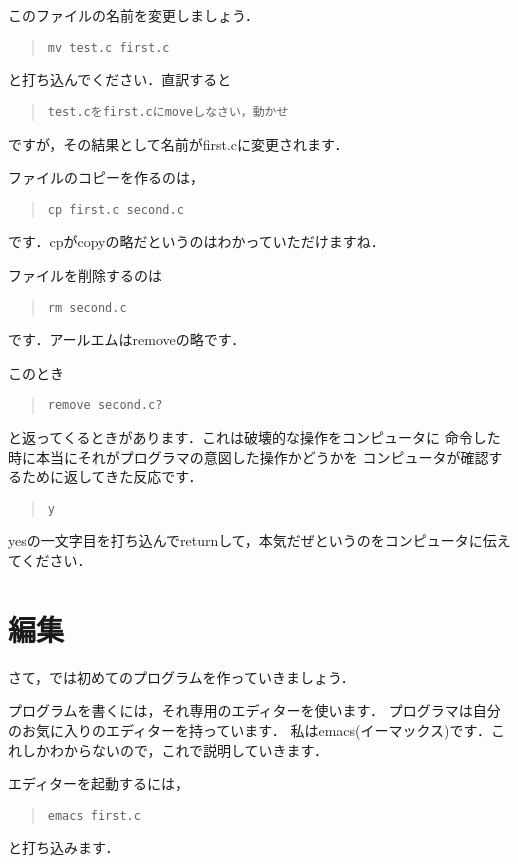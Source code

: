 \documentclass[12pt,a4paper]{jsarticle}
\begin{document}
このファイルの名前を変更しましょう．
\begin{quote}\begin{verbatim}
mv test.c first.c
\end{verbatim}\end{quote}
と打ち込んでください．直訳すると
\begin{quote}\begin{verbatim}
test.cをfirst.cにmoveしなさい，動かせ
\end{verbatim}\end{quote}
ですが，その結果として名前がfirst.cに変更されます．

ファイルのコピーを作るのは，
\begin{quote}\begin{verbatim}
cp first.c second.c
\end{verbatim}\end{quote}
です．cpがcopyの略だというのはわかっていただけますね．

ファイルを削除するのは
\begin{quote}\begin{verbatim}
rm second.c
\end{verbatim}\end{quote}
です．アールエムはremoveの略です．

このとき
\begin{quote}\begin{verbatim}
remove second.c?
\end{verbatim}\end{quote}
と返ってくるときがあります．これは破壊的な操作をコンピュータに
命令した時に本当にそれがプログラマの意図した操作かどうかを
コンピュータが確認するために返してきた反応です．
\begin{quote}\begin{verbatim}
y
\end{verbatim}\end{quote}
yesの一文字目を打ち込んでreturnして，本気だぜというのをコンピュータに伝えてください．

\section{編集}
さて，では初めてのプログラムを作っていきましょう．

プログラムを書くには，それ専用のエディターを使います．
プログラマは自分のお気に入りのエディターを持っています．
私はemacs(イーマックス)です．これしかわからないので，これで説明していきます．

エディターを起動するには，
\begin{quote}\begin{verbatim}
emacs first.c
\end{verbatim}\end{quote}
と打ち込みます．
\end{document}
